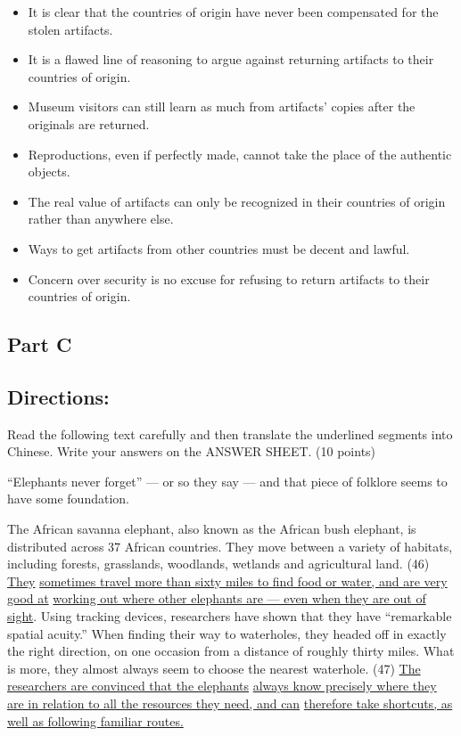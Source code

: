 \documentclass[UTF8,11pt]{ctexart}
\begin{document}
\begin{itemize}[leftmargin=2em,itemsep=.2em,topsep=.4em]\item[A.] It is clear that the countries of origin have never been compensated for the stolen artifacts.
\item[B.] It is a flawed line of reasoning to argue against returning artifacts to their countries of origin.
\item[C.] Museum visitors can still learn as much from artifacts’ copies after the originals are returned.
\item[D.] Reproductions, even if perfectly made, cannot take the place of the authentic objects.
\item[E.] The real value of artifacts can only be recognized in their countries of origin rather than anywhere else.
\item[F.] Ways to get artifacts from other countries must be decent and lawful.
\item[G.] Concern over security is no excuse for refusing to return artifacts to their countries of origin.
\end{itemize}

\subsection*{\textbf{Part C}}


\subsection*{\textbf{Directions:}}


Read the following text carefully and then translate the underlined segments into Chinese. Write your answers on the ANSWER SHEET. (10 points)


“Elephants never forget” — or so they say — and that piece of folklore seems to have some foundation.


The African savanna elephant, also known as the African bush elephant, is distributed across 37 African countries. They move between a variety of habitats, including forests, grasslands, woodlands, wetlands and agricultural land. (46) \uline{They} \uline{sometimes travel more than sixty miles to find food or water, and are very good at} \uline{working out where other elephants are — even when they are out of sight}. Using tracking devices, researchers have shown that they have “remarkable spatial acuity.” When finding their way to waterholes, they headed off in exactly the right direction, on one occasion from a distance of roughly thirty miles. What is more, they almost always seem to choose the nearest waterhole. (47) \uline{The researchers are convinced that the elephants} \uline{always know precisely where they are in relation to all the resources they need, and can} \uline{therefore take shortcuts, as well as following familiar routes.}
\end{document}
